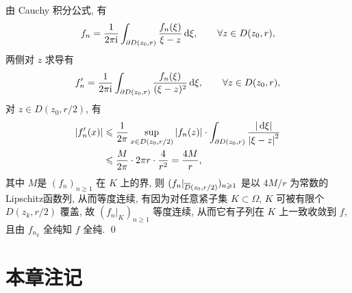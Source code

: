      \begin{Proof}
          由 Cauchy 积分公式, 有
          \[
               f_{n}=\frac{1}{2\pi \imag}\int_{\partial D(z_{0}, r)} \frac{f_{n}(\xi)}{\xi-z}\diff \xi,\qquad \forall z\in D(z_{0}, r),
          \]
          两侧对 $ z $ 求导有
          \[
               f'_{n}=\frac{1}{2\pi \imag}\int_{\partial D(z_{0}, r)} \frac{f_{n}(\xi)}{(\xi-z)^{2}}\diff \xi,\qquad \forall z\in D(z_{0}, r),
          \]
          对 $ z\in D(z_{0}, r/2) $, 有
          \[
               \begin{aligned}
                    \abs{f'_{n}(x)} & \leqslant \frac{1}{2\pi}\sup_{x\in D(z_{0}, r/2)}\abs{f_{n}(z)}\cdot\int_{\partial D(z_{0}, r)}\frac{\abs{\diff \xi}}{\abs{\xi-z}^{2}}\\
                    & \leqslant \frac{M}{2\pi}\cdot 2\pi r\cdot \frac{4}{r^{2}}=\frac{4M}{r},
               \end{aligned}
          \]
          其中 $ M $是 $ (f_{n})_{n\geqslant1} $ 在 $ K $ 上的界, 则 $ (f_{n}|_{\baro{D}(z_{0}, r/2)})_{n\geqslant1} $ 是以 $ 4M/r $ 为常数的  Lipschitz函数列, 从而等度连续, 有因为对任意紧子集 $ K\subset\varOmega $, 
          $ K $ 可被有限个 $ D(z_{k}, r/2) $ 覆盖, 故 $ (f_{n}|_{K})_{n\geqslant1} $ 等度连续, 从而它有子列在 $ K $ 上一致收敛到 $ f $, 且由 $ f_{n_{k}} $ 全纯知 $ f $ 全纯. \qed
     \end{Proof}
     \remark
     \section{本章注记}